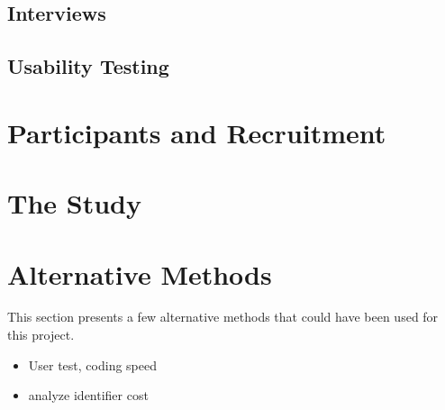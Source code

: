 \documentclass[../thesis.tex]{subfiles}
\begin{document}

\subsection{Interviews}

\subsection{Usability Testing}

\section{Participants and Recruitment}

\section{The Study}




\section{Alternative Methods}\label{alternative_methods}
This section presents a few alternative methods that could have been used for this project.
\begin{itemize}
    \item User test, coding speed
    \item analyze identifier cost
\end{itemize}
\end{document}
